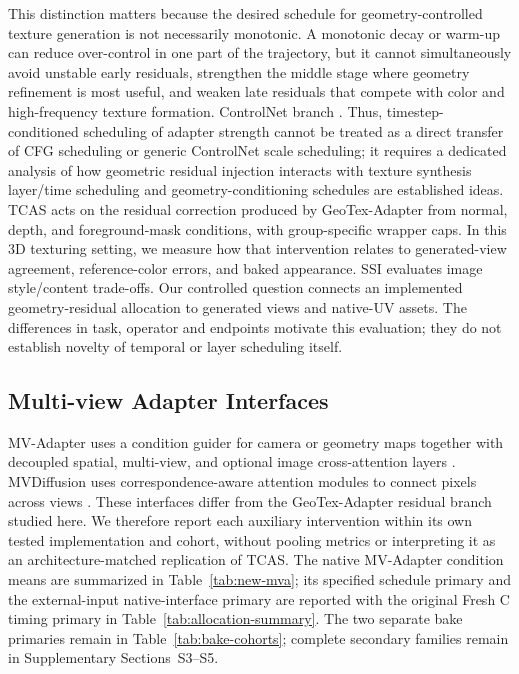 \documentclass[times,twocolumn,final]{elsarticle}
\providecommand{\DIFadd}[1]{{\protect\color{blue} \sf #1}} %
\providecommand{\DIFdel}[1]{{\protect\color{red} \scriptsize #1}} %
\providecommand{\DIFaddbegin}{} %
\providecommand{\DIFaddend}{} %
\providecommand{\DIFdelbegin}{} %
\providecommand{\DIFdelend}{} %
\begin{document}
\DIFdel{This distinction matters because the desired schedule for geometry-controlled texture generation is not necessarily monotonic. A monotonic decay or warm-up can reduce over-control in one part of the trajectory, but it cannot simultaneously avoid unstable early residuals, strengthen the middle stage where geometry refinement is most useful, and weaken late residuals that compete with color and high-frequency texture formation. }\DIFdelend \DIFaddbegin \DIFadd{ControlNet branch \cite{kulkarni2026ssi}. }\DIFaddend Thus, \DIFdelbegin \DIFdel{timestep-conditioned scheduling of adapter strength cannot be treated as a direct transfer of CFG scheduling or generic ControlNet scale scheduling; it requires a dedicated analysis of how geometric residual injection interacts with texture synthesis}\DIFdelend \DIFaddbegin \DIFadd{layer/time scheduling and geometry-conditioning schedules are established ideas. TCAS acts on the residual correction produced by GeoTex-Adapter from normal, depth, and foreground-mask conditions, with group-specific wrapper caps. In this 3D texturing setting, we measure how that intervention relates to generated-view agreement, reference-color errors, and baked appearance. SSI evaluates image style/content trade-offs. Our controlled question connects an implemented geometry-residual allocation to generated views and native-UV assets. The differences in task, operator and endpoints motivate this evaluation; they do not establish novelty of temporal or layer scheduling itself.
}

\subsection{Multi-view Adapter Interfaces}
\label{subsec:mvinterfaces}

\DIFadd{MV-Adapter uses a condition guider for camera or geometry maps together with decoupled spatial, multi-view, and optional image cross-attention layers \cite{huang2024mvadapter}. MVDiffusion uses correspondence-aware attention modules to connect pixels across views \cite{tang2023mvdiffusion}. These interfaces differ from the GeoTex-Adapter residual branch studied here. We therefore report each auxiliary intervention within its own tested implementation and cohort, without pooling metrics or interpreting it as an architecture-matched replication of TCAS. The native MV-Adapter condition means are summarized in Table~\ref{tab:new-mva}; its specified schedule primary and the external-input native-interface primary are reported with the original Fresh C timing primary in Table~\ref{tab:allocation-summary}. The two separate bake primaries remain in Table~\ref{tab:bake-cohorts}; complete secondary families remain in Supplementary Sections~S3--S5}\DIFaddend .
\end{document}

